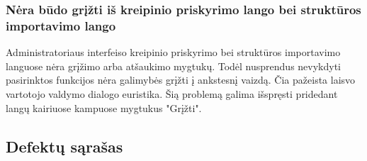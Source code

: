 	\subsubsection{Nėra būdo grįžti iš kreipinio priskyrimo lango bei struktūros importavimo lango}
	
		Administratoriaus interfeiso kreipinio priskyrimo bei struktūros importavimo languose nėra grįžimo arba atšaukimo mygtukų.
		Todėl nusprendus nevykdyti pasirinktos funkcijos nėra galimybės grįžti į ankstesnį vaizdą.
		Čia pažeista laisvo vartotojo valdymo dialogo euristika.
		Šią problemą galima išspręsti pridedant langų kairiuose kampuose mygtukus "Grįžti".
	
\subsection{Defektų sąrašas}
	
